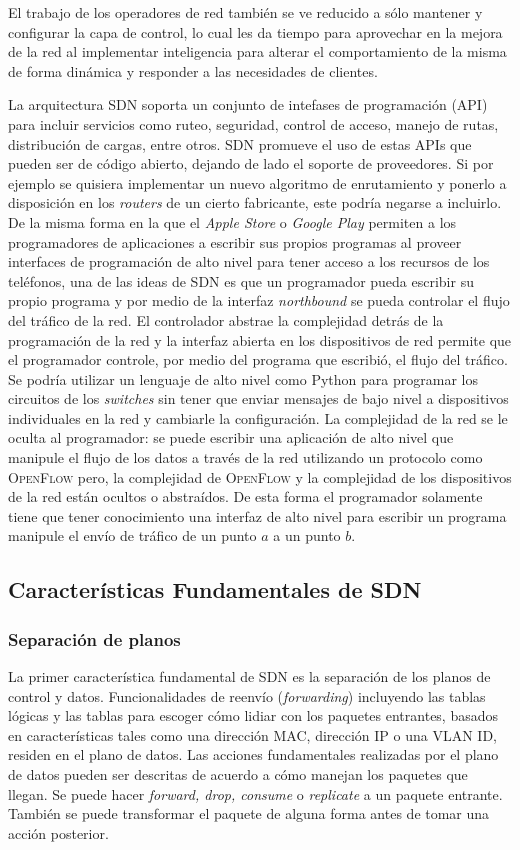 \documentclass[10pt,journal,compsoc]{IEEEtran}
\begin{document}
El trabajo de los operadores de red también se ve reducido a sólo mantener y configurar la capa de control, lo cual les da tiempo para aprovechar en la mejora de la red al implementar inteligencia para alterar el comportamiento de la misma de forma dinámica y responder a las necesidades de clientes. 

La arquitectura SDN soporta un conjunto de intefases de programación (API) para incluir servicios como ruteo, seguridad, control de acceso, manejo de rutas, distribución de cargas, entre otros. SDN promueve el uso de estas APIs que pueden ser de código abierto, dejando de lado el soporte de proveedores. Si por ejemplo se quisiera implementar un nuevo algoritmo de enrutamiento y ponerlo a disposición en los \emph{routers} de un cierto fabricante, este podría negarse a incluirlo. De la misma forma en la que el \emph{Apple Store} o \emph{Google Play} permiten a los programadores de aplicaciones a escribir sus propios programas al proveer interfaces de programación de alto nivel para tener acceso a los recursos de los teléfonos, una de las ideas de SDN es que un programador pueda escribir su propio programa y por medio de la interfaz \emph{northbound} se pueda controlar el flujo del tráfico de la red. El controlador abstrae la complejidad detrás de la programación de la red y la interfaz abierta en los dispositivos de red permite que el programador controle, por medio del programa que escribió, el flujo del tráfico. Se podría utilizar un lenguaje de alto nivel como Python para programar los circuitos de los \emph{switches} sin tener que enviar mensajes de bajo nivel a dispositivos individuales en la red y cambiarle la configuración. La complejidad de la red se le oculta al programador: se puede escribir una aplicación de alto nivel que manipule el flujo de los datos a través de la red utilizando un protocolo como \textsc{OpenFlow} pero, la complejidad de \textsc{OpenFlow} y la complejidad de los dispositivos de la red están ocultos o abstraídos. De esta forma el programador solamente tiene que tener conocimiento una interfaz de alto nivel para escribir un programa manipule el envío de tráfico de un punto $a$ a un punto $b$.

\subsection{Características Fundamentales de SDN}

\subsubsection{Separación de planos}
La primer característica fundamental de SDN es la separación de los planos de control y datos. Funcionalidades de reenvío (\emph{forwarding}) incluyendo las tablas lógicas y las tablas para escoger cómo lidiar con los paquetes entrantes, basados en características tales como una dirección MAC, dirección IP o una VLAN ID, residen en el plano de datos. Las acciones fundamentales realizadas por el plano de datos pueden ser descritas de acuerdo a cómo manejan los paquetes que llegan. Se puede hacer \emph{forward, drop, consume} o \emph{replicate} a un paquete entrante. También se puede transformar el paquete de alguna forma antes de tomar una acción posterior. 
\end{document}
